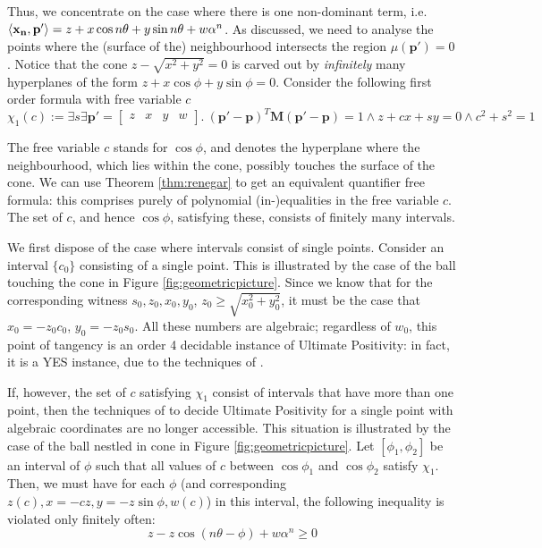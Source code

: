 Thus, we concentrate on the case where there is one non-dominant term, i.e. $\langle\mathbf{x_n}, \mathbf{p'}\rangle = z + x\cos n\theta + y\sin n\theta + w\alpha^n$. As discussed, we need to analyse the points where the (surface of the) neighbourhood intersects the region $\mu(\mathbf{p'}) = 0$. Notice that the cone $z - \sqrt{x^2 + y^2} = 0$ is carved out by \textit{infinitely} many hyperplanes of the form $z + x\cos\phi + y\sin\phi = 0$. Consider the following first order formula with free variable $c$
\begin{equation}
\label{eq:intersection}
\chi_1(c):= \exists s \exists \mathbf{p'} = \begin{bmatrix}
z & x & y & w
\end{bmatrix}.~ (\mathbf{p'} - \mathbf{p})^T\mathbf{M}(\mathbf{p'} - \mathbf{p}) = 1 \land z + cx + sy = 0 \land c^2 + s^2 = 1
\end{equation}

The free variable $c$ stands for $\cos \phi$, and denotes the hyperplane where the neighbourhood, which lies within the cone, possibly touches the surface of the cone. We can use Theorem \ref{thm:renegar} to get an equivalent quantifier free formula: this comprises purely of polynomial (in-)equalities in the free variable $c$. The set of $c$, and hence $\cos \phi$, satisfying these, consists of finitely many intervals. 

We first dispose of the case where intervals consist of single points. Consider an interval $\{c_0\}$ consisting of a single point. This is illustrated by the case of the ball touching the cone in Figure \ref{fig:geometricpicture}. Since we know that for the corresponding witness $s_0, z_0, x_0, y_0$, $z_0 \ge \sqrt{x_0^2 + y_0^2}$, it must be the case that $x_0 = -z_0c_0$, $y_0 = -z_0s_0$. All these numbers are algebraic; regardless of $w_0$, this point of tangency is an order 4 decidable instance of Ultimate Positivity: in fact, it is a YES instance, due to the techniques of \cite{ouaknine2014ultimate}.

If, however, the set of $c$ satisfying $\chi_1$ consist of intervals that have more than one point, then the techniques of \cite{ouaknine2014ultimate} to decide Ultimate Positivity for a single point with algebraic coordinates are no longer accessible. This situation is illustrated by the case of the ball nestled in cone in Figure \ref{fig:geometricpicture}. Let $[\phi_1, \phi_2]$ be an interval of $\phi$ such that all values of $c$ between $\cos\phi_1$ and $\cos\phi_2$ satisfy $\chi_1$. Then, we must have for each $\phi$ (and corresponding $z(c), x = -cz, y = -z\sin \phi, w(c)$) in this interval, the following inequality is violated only finitely often:
\begin{equation}
z - z\cos(n\theta - \phi) + w\alpha^n \ge 0
\end{equation}

